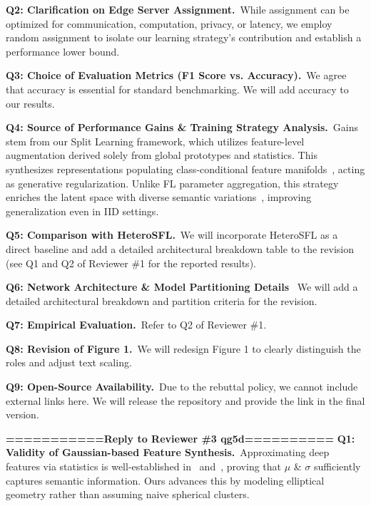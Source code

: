 \documentclass[10pt,twocolumn,letterpaper]{article}
\begin{document}
\noindent\textbf{Q2: Clarification on Edge Server Assignment.}~While assignment can be optimized for communication, computation, privacy, or latency, we employ random assignment to isolate our learning strategy's contribution and establish a performance lower bound.

\noindent\textbf{Q3: Choice of Evaluation Metrics (F1 Score vs. Accuracy).}~We agree that accuracy is essential for standard benchmarking. We will add accuracy to our results. 


\noindent\textbf{Q4: Source of Performance Gains \& Training Strategy Analysis.}~Gains stem from our Split Learning framework, which utilizes feature-level augmentation derived solely from global prototypes and statistics. This synthesizes representations populating class-conditional feature manifolds~\cite{tan2022fedproto}, acting as generative regularization. Unlike FL parameter aggregation, this strategy enriches the latent space with diverse semantic variations~\cite{Zhu2021Prototype}, improving generalization even in IID settings.

\noindent\textbf{Q5: Comparison with HeteroSFL.}~We will incorporate HeteroSFL as a direct baseline and add a detailed architectural breakdown table to the revision (see Q1 and Q2 of Reviewer \#1 for the reported results).

\noindent\textbf{Q6: Network Architecture \& Model Partitioning Details}~
We will add a detailed architectural breakdown and partition criteria for the revision.

\noindent\textbf{Q7: Empirical Evaluation.}~Refer to Q2 of Reviewer \#1.

\noindent\textbf{Q8: Revision of Figure 1.}~We will redesign Figure 1 to clearly distinguish the roles and adjust text scaling.

\noindent\textbf{Q9: Open-Source Availability.}~Due to the rebuttal policy, we cannot include external links here. We will release the repository and provide the link in the final version.

\noindent\textbf{===========Reply to Reviewer \#3 qg5d==========}
\noindent\textbf{Q1: Validity of Gaussian-based Feature Synthesis.}~Approximating deep features via statistics is well-established in~\cite{tan2022fedproto} and~\cite{Zhu2021Prototype}, proving that $\mu$ \& $\sigma$ sufficiently captures semantic information. Ours advances this by modeling elliptical geometry rather than assuming naive spherical clusters.
\end{document}
